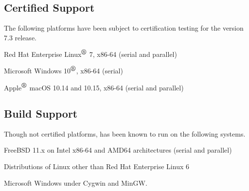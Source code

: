 \documentclass[letterpaper]{scrartcl}
\begin{document}
\subsection*{Certified Support}
The following platforms have been subject to certification testing for the
\Xyce{} version 7.3 release.
\begin{XyceItemize}
  \item Red Hat Enterprise Linux${}^{\mbox{\textregistered}}$ 7, x86-64 (serial and parallel)
  \item Microsoft Windows 10${}^{\mbox{\textregistered}}$, x86-64 (serial)
  \item Apple${}^{\mbox{\textregistered}}$ macOS 10.14 and 10.15, x86-64 (serial and parallel)
\end{XyceItemize}


\subsection*{Build Support}
Though not certified platforms, \Xyce{} has been known to run on the following
systems.
\begin{XyceItemize}
  \item FreeBSD 11.x on Intel x86-64 and AMD64 architectures (serial
    and parallel)
  \item Distributions of Linux other than Red Hat Enterprise Linux 6
  \item Microsoft Windows under Cygwin and MinGW.
\end{XyceItemize}
\end{document}
